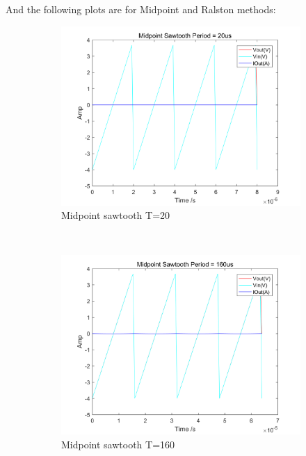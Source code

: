 \documentclass[a4paper, 12pt]{article}
\begin{document}
\newpage
And the following plots are for Midpoint and Ralston methods:
\begin{figure}[h]
      \centering
      \begin{subfigure}[b]{0.4\textwidth}
            \includegraphics[width=\textwidth]{ex1/new_mid_sawtooth_20.PNG}
            \caption{Midpoint sawtooth T=20}
      \end{subfigure}
      ~
      \begin{subfigure}[b]{0.4\textwidth}
            \includegraphics[width=\textwidth]{ex1/new_mid_sawtooth_160.PNG}
            \caption{Midpoint sawtooth T=160}
      \end{subfigure}
       ~
      \begin{subfigure}[b]{0.4\textwidth}

\end{subfigure}
\end{figure}
\end{document}
